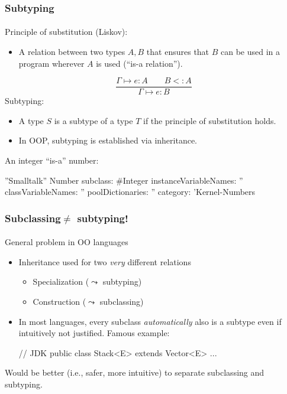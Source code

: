 \documentclass{beamer}
\begin{document}
\begin{frame}[fragile]
\frametitle{Subtyping}
\framesubtitle{}
Principle of substitution (Liskov):
\begin{itemize}
\item A relation between two types $A,B$ that ensures that 
$B$ can be used in a program wherever $A$ is used (``is-a relation'').
\end{itemize}
\[
\frac{\Gamma \mapsto e: A \qquad B <: A}
         {\Gamma \mapsto e:B }
\]
Subtyping:
\begin{itemize}
\item 
A type $S$ is a subtype of a type $T$ if the principle of substitution
holds.
\item In OOP, subtyping is established via inheritance. 
\end{itemize}
\bigskip
An integer ``is-a'' number: 
\begin{java}
''Smalltalk''
Number subclass: #Integer
   instanceVariableNames: ''
   classVariableNames: ''
   poolDictionaries: ''
   category: 'Kernel-Numbers
\end{java}


\end{frame}

\begin{frame}[fragile]
\frametitle{Subclassing$\neq$ subtyping!}
\framesubtitle{}
General problem in OO languages 

\begin{itemize}
\item  Inheritance used for two \textit{very}
different relations
\begin{itemize}
\item Specialization ($\leadsto$ subtyping)
\item Construction   ($\leadsto$ subclassing)
\end{itemize}
\item In most languages, every subclass 
\textit{automatically} also is a  subtype even if
intuitively  not justified. Famous example:
\begin{java}
// JDK
public class Stack<E> extends Vector<E> {...}
\end{java}
\end{itemize}
\bigskip

Would be better (i.e., safer, more intuitive) 
to separate  subclassing and subtyping. 
\end{frame}
\end{document}
